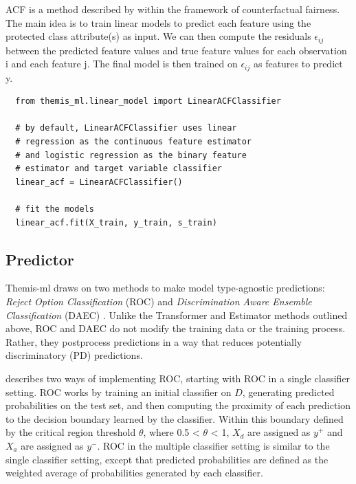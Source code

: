 \documentclass{{interact/interact}}
\begin{document}
ACF is a method described by \cite{kusner2017counterfactual} within the
framework of counterfactual fairness. The main idea is to train linear models to
predict each feature using the protected class attribute(s) as input. We can
then compute the residuals \(\epsilon_{ij}\) between the predicted feature
values and true feature values for each observation i and each feature j. The
final model is then trained on \(\epsilon_{ij}\) as features to predict y.

\begin{verbatim}
  from themis_ml.linear_model import LinearACFClassifier

  # by default, LinearACFClassifier uses linear
  # regression as the continuous feature estimator
  # and logistic regression as the binary feature
  # estimator and target variable classifier
  linear_acf = LinearACFClassifier()

  # fit the models
  linear_acf.fit(X_train, y_train, s_train)
\end{verbatim}

\subsection{Predictor}

Themis-ml draws on two methods to make model type-agnostic predictions:
\emph{Reject Option Classification} (ROC) and \emph{Discrimination Aware
Ensemble Classification} (DAEC) \cite{kamiran2012decision}. Unlike the
Transformer and Estimator methods outlined above, ROC and DAEC do not modify the
training data or the training process. Rather, they postprocess predictions in a
way that reduces potentially discriminatory (PD) predictions.

\cite{kamiran2012decision} describes two ways of implementing ROC, starting with
ROC in a single classifier setting. ROC works by training an initial classifier
on \(D\), generating predicted probabilities on the test set, and then computing the
proximity of each prediction to the decision boundary learned by the classifier.
Within this boundary defined by the critical region threshold \(\theta\), where
0.5 < \(\theta\) < 1, \(X_d\) are assigned as \(y^{+}\) and \(X_a\) are assigned
as \(y^{-}\). ROC in the multiple classifier setting is similar to the single
classifier setting, except that predicted probabilities are defined as the
weighted average of probabilities generated by each classifier.
\end{document}
